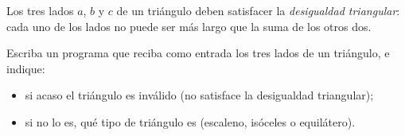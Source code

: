 Los tres lados \(a\), \(b\) y \(c\) de un triángulo
deben satisfacer la \emph{desigualdad triangular}:
cada uno de los lados no puede ser más
largo que la suma de los otros dos.

Escriba un programa que reciba como entrada
los tres lados de un triángulo, e indique:
\begin{itemize}
  \item si acaso el triángulo es inválido
    (no satisface la desigualdad triangular);
  \item si no lo es, qué tipo de triángulo es
    (escaleno, isóceles o equilátero).
\end{itemize}

\begin{minipage}[t]{.40\textwidth}
  
\end{minipage}
\hfil
\begin{minipage}[t]{.40\textwidth}
  
\end{minipage}
\\
\begin{minipage}[t]{.40\textwidth}
  
\end{minipage}
\hfil
\begin{minipage}[t]{.40\textwidth}
  
\end{minipage}

